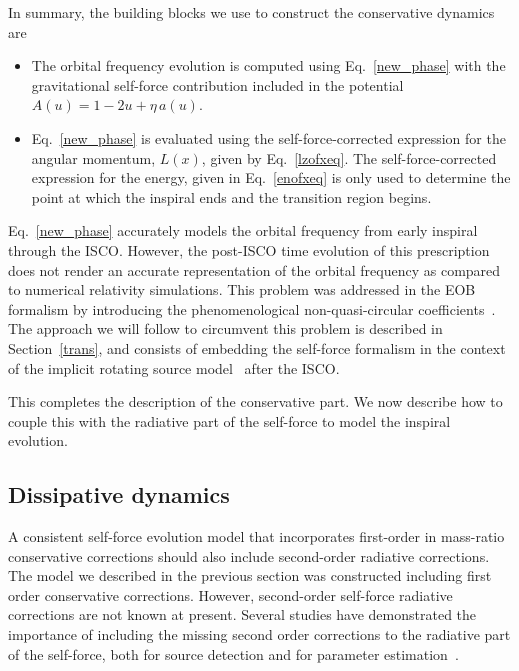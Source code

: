 In summary, the building blocks we use to construct the conservative dynamics are

\begin{itemize}
\item The orbital frequency evolution is computed using Eq.~\eqref{new_phase} with the gravitational self-force contribution included in the potential \(A(u)= 1-2u + \eta\, a(u)\).
\item Eq.~\eqref{new_phase} is evaluated using the self-force-corrected expression for the angular momentum, \(L(x)\), given by Eq.~\eqref{lzofxeq}. The self-force-corrected expression for the energy, given in Eq.~\eqref{enofxeq} is only used to determine the point at which the inspiral ends and the transition region begins.
\end{itemize}

Eq.~\eqref{new_phase} accurately models the orbital frequency from early 
inspiral through the ISCO. However, the post-ISCO time evolution of this 
prescription does not render an accurate representation of the orbital 
frequency as compared to numerical relativity simulations. 
This problem was addressed in the EOB formalism by introducing the 
phenomenological non-quasi-circular coefficients~\cite{BuonannoEOBv2Main}.
The approach we will follow to circumvent this problem is described
in Section~\ref{trans}, and consists of embedding the self-force formalism
in the context of the implicit rotating source model~\cite{Baker:2008} 
after the ISCO.

This completes the description of the conservative part. We now describe how to couple this with the radiative part of the self-force to model the inspiral evolution. 
 
 \subsection{Dissipative dynamics}
\label{ssec:dissipative}
A consistent self-force evolution model that incorporates first-order in mass-ratio conservative  corrections should also include second-order radiative corrections. The model we described in the previous section was constructed including first order conservative corrections. However, second-order self-force radiative corrections are not known at present. Several studies have demonstrated the importance of including the missing second order corrections to the radiative part of the self-force, both for source detection and for parameter estimation~\cite{Isoyama:2013, Burko:2012, Huerta:2012, Huerta:2010, Huerta:2009}. 

